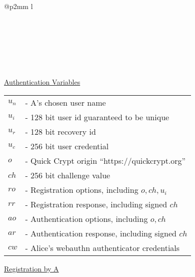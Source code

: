 \documentclass{article}
\begin{document}
\begin{tabular}{@{}p{2mm} l}
\\
\\
\\
\\
\\
\\
\\
\end{tabular}

\newpage

\underline{Authentication Variables}\\

\begin{tabular}{@{}p{2mm} l}
$u_n$ & \textrm{ - A's chosen user name} \\
$u_i$ & \textrm{ - 128 bit user id guaranteed to be unique} \\
$u_r$ & \textrm{ - 128 bit recovery id} \\
$u_c$ & \textrm{ - 256 bit user credential}\\
$o$ & \textrm{ - Quick Crypt origin ``https://quickcrypt.org''} \\
$ch$ & \textrm{ - 256 bit challenge value} \\
$ro$ & \textrm{ - Registration options, including }$o, ch, u_i$\\
$rr$ & \textrm{ - Registration response, including signed }$ch$\\
$ao$ & \textrm{ - Authentication options, including }$o, ch$\\
$ar$ & \textrm{ - Authentication response, including signed }$ch$\\
$cw$ & \textrm{ - Alice's webauthn authenticator credentials} \\
\end{tabular}

\hfill \break

\underline{Registration by A}\\
\end{document}
